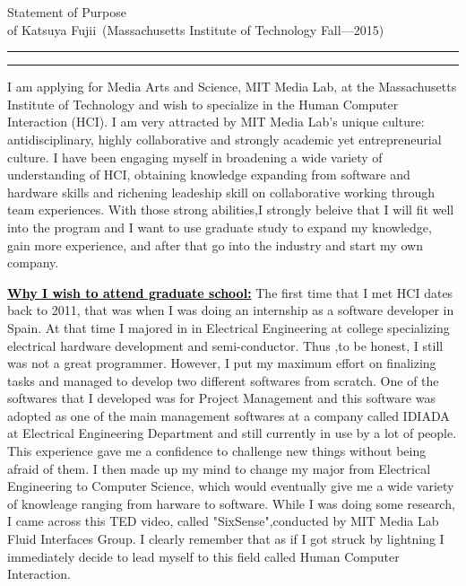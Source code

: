 \documentclass{article}
\newcommand{\soptitle}{Statement of Purpose}
\newcommand{\yourname}{Katsuya Fujii}
\newcommand{\statement}[1]{\par\medskip
  \underline{\textcolor{black}{\textbf{#1:}}}\space
}
\begin{document}
\begin{center}\LARGE\soptitle\\
\large of \yourname\ (Massachusetts Institute of Technology Fall---2015)
\end{center}

\hrule
\vspace{1pt}
\hrule height 1pt

\bigskip


I am applying for Media Arts and Science, MIT Media Lab, at the Massachusetts Institute of Technology and wish to specialize in the Human Computer Interaction (HCI). I am very attracted by MIT Media Lab's unique culture: antidisciplinary, highly collaborative and strongly academic yet entrepreneurial culture. I have been engaging myself in broadening a wide variety of understanding of HCI, obtaining knowledge expanding from software and hardware skills and richening leadeship skill on collaborative working through team experiences. With those strong abilities,I strongly beleive that I will fit well into the program and I want to use graduate study to expand my knowledge, gain more experience, and after that go into the industry and start my own company.


\statement{Why I wish to attend graduate school} The first time that I met HCI dates back to 2011, that was when I was doing an internship as a software developer in Spain. At that time I majored in in Electrical Engineering at college specializing electrical hardware development and semi-conductor. Thus ,to be honest, I still was not a great programmer. However, I put my maximum effort on finalizing tasks and managed to develop two different softwares from scratch. One of the softwares that I developed was for Project Management and this software was adopted as one of the main management softwares at a company called IDIADA at Electrical Engineering Department and still currently in use by a lot of people. This experience gave me a confidence to challenge new things without being afraid of them. I then made up my mind to change my major from Electrical Engineering to Computer Science, which would eventually give me a wide variety of knowleage ranging from harware to software.  While I was doing some research, I came across this TED video, called "SixSense",conducted by MIT Media Lab Fluid Interfaces Group. I clearly remember that as if I got struck by lightning I immediately decide to lead myself to this field called Human Computer Interaction. 
\end{document}
